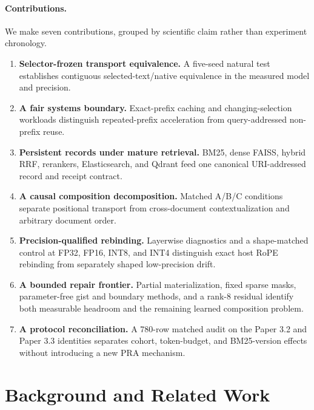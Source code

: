\documentclass[11pt]{article}
\begin{document}
\paragraph{Contributions.}
We make seven contributions, grouped by scientific claim rather than experiment
chronology.
\begin{enumerate}[leftmargin=*]
    \item \textbf{Selector-frozen transport equivalence.} A five-seed natural
    test establishes contiguous selected-text/native equivalence in the
    measured model and precision.
    \item \textbf{A fair systems boundary.} Exact-prefix caching and
    changing-selection workloads distinguish repeated-prefix acceleration from
    query-addressed non-prefix reuse.
    \item \textbf{Persistent records under mature retrieval.} BM25, dense
    FAISS, hybrid RRF, rerankers, Elasticsearch, and Qdrant feed one canonical
    URI-addressed record and receipt contract.
    \item \textbf{A causal composition decomposition.} Matched A/B/C
    conditions separate positional transport from cross-document
    contextualization and arbitrary document order.
    \item \textbf{Precision-qualified rebinding.} Layerwise diagnostics and a
    shape-matched control at FP32, FP16, INT8, and INT4 distinguish exact host
    RoPE rebinding from separately shaped low-precision drift.
    \item \textbf{A bounded repair frontier.} Partial materialization, fixed
    sparse masks, parameter-free gist and boundary methods, and a rank-8
    residual identify both measurable headroom and the remaining learned
    composition problem.
    \item \textbf{A protocol reconciliation.} A 780-row matched audit on the
    Paper 3.2 and Paper 3.3 identities separates cohort, token-budget, and
    BM25-version effects without introducing a new PRA mechanism.
\end{enumerate}

\section{Background and Related Work}
\end{document}
